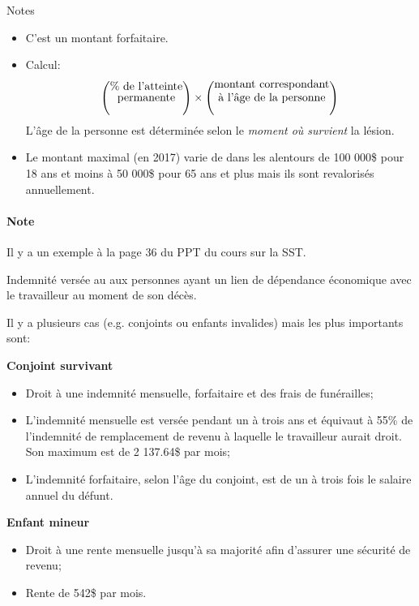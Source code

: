 \documentclass[10pt, french]{article}
\begin{document}
\begin{multicols*}{3}
\begin{definitionNOHFILL}
Notes
\begin{itemize}[leftmargin = *]
	\item	C'est un montant forfaitaire.
	\item	Calcul: 
	\setlength{\mathindent}{-1.5cm}
		\begin{align*}
		\left(\shortstack{\% de l'atteinte\\ permanente}\right)	\times	\left(\shortstack{montant correspondant \\ à l'âge de la personne}\right)
		\end{align*}
	\setlength{\mathindent}{1cm}
			L'âge de la personne est déterminée selon le \textit{moment où survient} la lésion.
	\item	Le montant maximal (en 2017) varie de dans les alentours de 100 000\$ pour 18 ans et moins à 50 000\$ pour 65 ans et plus mais ils sont revalorisés annuellement.
\end{itemize}
\paragraph{Note}	Il y a un exemple à la page 36 du PPT du cours sur la SST.
\end{definitionNOHFILL}

\begin{definitionNOHFILL}
Indemnité versée au aux personnes ayant un lien de dépendance économique avec le travailleur au moment de son décès.

Il y a plusieurs cas (e.g. conjoints ou enfants invalides) mais les plus importants sont:

\textbf{Conjoint survivant}
\begin{itemize}[leftmargin = *]
	\item	Droit à une indemnité mensuelle, forfaitaire et des frais de funérailles;
	\item	L'indemnité mensuelle est versée pendant un à trois ans et équivaut à 55\% de l'indemnité de remplacement de revenu à laquelle le travailleur aurait droit.\\
			Son maximum est de 2 137.64\$ par mois;
	\item	L'indemnité forfaitaire, selon l'âge du conjoint, est de un à trois fois le salaire annuel du défunt.
\end{itemize}

\textbf{Enfant mineur}
\begin{itemize}[leftmargin = *]
	\item	Droit à une rente mensuelle jusqu'à sa majorité afin d'assurer une sécurité de revenu;
	\item	Rente de 542\$ par mois.
\end{itemize}


\end{definitionNOHFILL}
\end{multicols*}
\end{document}
